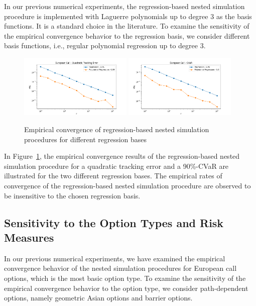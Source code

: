 In our previous numerical experiments, the regression-based nested simulation procedure is implemented with Laguerre polynomials up to degree $3$ as the basis functions.
It is a standard choice in the literature.
To examine the sensitivity of the empirical convergence behavior to the regression basis, we consider different basis functions, i.e., regular polynomial regression up to degree $3$.

\begin{figure}[ht!] 
    \centering
    \includegraphics[width=0.48\textwidth]{./project1/figures/figure13a.png}
    \includegraphics[width=0.48\textwidth]{./project1/figures/figure13b.png}
    \caption{Empirical convergence of regression-based nested simulation procedures for different regression bases}
    \label{fig1:sens_basis}
\end{figure}

In Figure~\ref{fig1:sens_basis}, the empirical convergence results of the regression-based nested simulation procedure for a quadratic tracking error and a 90\%-CVaR are illustrated for the two different regression bases.
The empirical rates of convergence of the regression-based nested simulation procedure are observed to be insensitive to the chosen regression basis.

\subsection{Sensitivity to the Option Types and Risk Measures} \label{sec1:sensitivity-option-type}

In our previous numerical experiments, we have examined the empirical convergence behavior of the nested simulation procedures for European call options, which is the most basic option type.
To examine the sensitivity of the empirical convergence behavior to the option type, we consider path-dependent options, namely geometric Asian options and barrier options.


